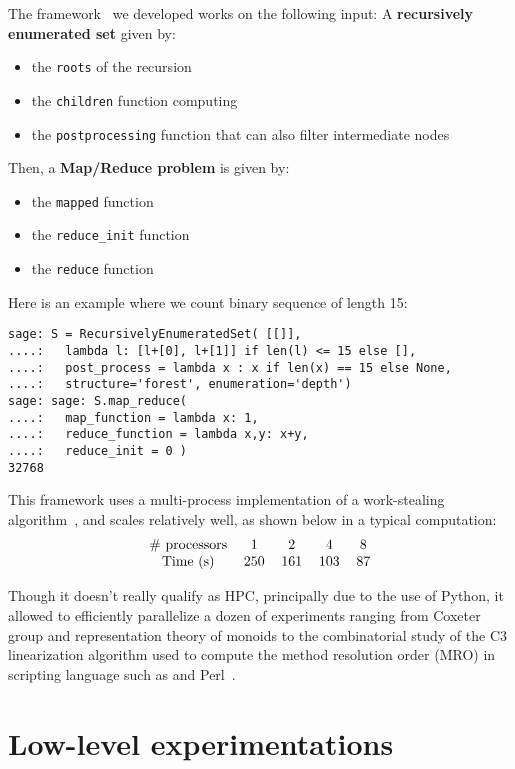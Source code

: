 \documentclass{deliverablereport}
\begin{document}
The framework~\cite{map-reduce} we developed works on the following input:
A \textbf{recursively enumerated set} given by:
\begin{itemize}
\item the \texttt{roots} of the recursion
\item the \texttt{children} function computing
\item the \texttt{postprocessing} function that can also filter intermediate
  nodes
\end{itemize}
Then, a \textbf{Map/Reduce problem} is given by:
\begin{itemize}
\item the \texttt{mapped} function
\item the \verb|reduce_init| function
\item the \texttt{reduce} function
\end{itemize}
Here is an example where we count binary sequence of length 15:
\begin{verbatim}
sage: S = RecursivelyEnumeratedSet( [[]],
....:   lambda l: [l+[0], l+[1]] if len(l) <= 15 else [],
....:   post_process = lambda x : x if len(x) == 15 else None,
....:   structure='forest', enumeration='depth') 
sage: sage: S.map_reduce(
....:   map_function = lambda x: 1,
....:   reduce_function = lambda x,y: x+y,
....:   reduce_init = 0 )
32768
\end{verbatim}
This framework uses a multi-process implementation of a work-stealing
algorithm~\cite{BlumofeL99, BlumofeL99}, and scales relatively well, as shown
below in a typical computation:
\[\begin{tabular}{ccccc}
\# processors & 1 & 2 & 4 & 8 \\
Time (s) & 250& 161& 103 & 87 \\
\end{tabular}
\]

Though it doesn't really qualify as HPC, principally due to the use of Python,
it allowed to efficiently parallelize a dozen of experiments ranging from
Coxeter group and representation theory of monoids to the combinatorial study
of the C3 linearization algorithm used to compute the method resolution order
(MRO) in scripting language such as \Python and Perl~\cite{C3-controled}.

\section{Low-level experimentations}
\label{sec:low:level}
\end{document}

